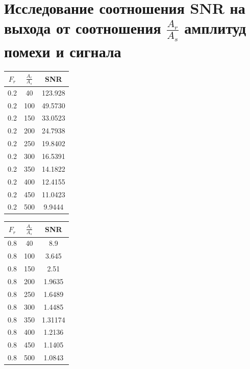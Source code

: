 \documentclass[12pt, a4paper] {ncc}
\begin{document}
\section{Исследование соотношения SNR на выхода от соотношения $\frac {A_r} {A_s}$ амплитуд помехи и сигнала}
        \begin{table}[H]
            \centering
            \begin{tabular} { |c|c|c| }
                \hline
                \textbf{$F_r$} & \textbf{$\frac{A_r} {A_s}$} & \textbf{SNR} \\ \hline
                     0.2	   & 40  & 123.928 \\ \hline
                     0.2	   & 100 & 49.5730 \\ \hline
                     0.2	   & 150 & 33.0523 \\ \hline
                     0.2	   & 200 & 24.7938 \\ \hline
                     0.2	   & 250 & 19.8402 \\ \hline
                     0.2	   & 300 & 16.5391 \\ \hline
                     0.2	   & 350 & 14.1822 \\ \hline
                     0.2	   & 400 & 12.4155 \\ \hline
                     0.2	   & 450 & 11.0423 \\ \hline
                     0.2	   & 500 & 9.9444 \\ \hline 
            \end{tabular}
            \begin{tabular} { |c|c|c| }
                \hline
                \textbf{$F_r$} & \textbf{$\frac{A_r} {A_s}$} & \textbf{SNR} \\ \hline
						0.8 &  40  & 8.9 \\ \hline
						0.8 &  100 & 3.645 \\ \hline
						0.8 &  150 & 2.51 \\ \hline
						0.8 &  200 & 1.9635 \\ \hline
						0.8 &  250 & 1.6489 \\ \hline
						0.8 &  300 & 1.4485 \\ \hline
						0.8 &  350 & 1.31174 \\ \hline
						0.8 &  400 & 1.2136 \\ \hline
						0.8 &  450 & 1.1405 \\ \hline
						0.8 &  500 & 1.0843 \\ \hline
            \end{tabular}

\end{table}
\end{document}
